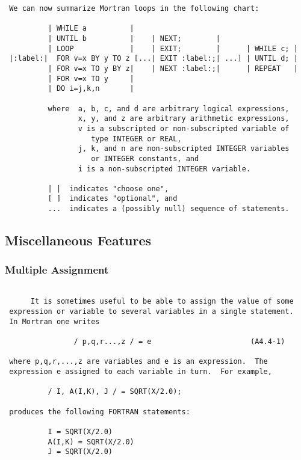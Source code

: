 \newpage \begin{verbatim}
 We can now summarize Mortran loops in the following chart:

          | WHILE a          |
          | UNTIL b          |    | NEXT;        |
          | LOOP             |    | EXIT;        |      | WHILE c; |
 |:label:|  FOR v=x BY y TO z [...| EXIT :label:;| ...] | UNTIL d; |
          | FOR v=x TO y BY z|    | NEXT :label:;|      | REPEAT   |
          | FOR v=x TO y     |
          | DO i=j,k,n       |

          where  a, b, c, and d are arbitrary logical expressions,
                 x, y, and z are arbitrary arithmetic expressions,
                 v is a subscripted or non-subscripted variable of
                    type INTEGER or REAL,
                 j, k, and n are non-subscripted INTEGER variables
                    or INTEGER constants, and
                 i is a non-subscripted INTEGER variable.

          | |  indicates "choose one",
          [ ]  indicates "optional", and
          ...  indicates a (possibly null) sequence of statements.

 \end{verbatim}
 \subsection{Miscellaneous Features}
 \subsubsection{Multiple Assignment}
 \begin{verbatim}

      It is sometimes useful to be able to assign the value of some
 expression or variable to several variables in a single statement.
 In Mortran one writes

                / p,q,r...,z / = e                       (A4.4-1)

 where p,q,r,...,z are variables and e is an expression.  The
 expression e assigned to each variable in turn.  For example,

          / I, A(I,K), J / = SQRT(X/2.0);

 produces the following FORTRAN statements:

          I = SQRT(X/2.0)
          A(I,K) = SQRT(X/2.0)
          J = SQRT(X/2.0)
 \end{verbatim}
